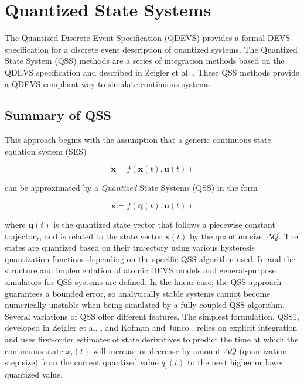 
\chapter{Quantized State Systems}\label{chap:qss}

The Quantized Discrete Event Specification (QDEVS) \cite{zeigler2018} provides a formal DEVS specification for a discrete event description of quantized systems. The Quantized State System (QSS) methods are a series of integration methods based on the QDEVS specification and described in Zeigler et al. \cite{zeigler2018}. These QSS methods provide a QDEVS-compliant way to simulate continuous systems.

\section{Summary of QSS}

This approach begins with the assumption that a generic continuous state equation system (SES)

\begin{equation} \label{eq:ses}
    \mathbf{\dot x} = f(\mathbf{x}(t), \mathbf{u}(t))
\end{equation}

\noindent can be approximated by a \emph{Quantized} State Systems (QSS) in the form

\begin{equation} \label{eq:qss}
    \mathbf{\dot x} = f(\mathbf{q}(t), \mathbf{u}(t))
\end{equation}

where $\mathbf{q}(t)$ is the quantized state vector that follows a piecewise constant trajectory, and is related to the state vector $\mathbf{x}(t)$ by the quantum size $\Delta Q$. The states are quantized based on their trajectory using various hysteresis quantization functions depending on the specific QSS algorithm used. In \cite{kofman2001} and \cite{cellier1993} the structure and implementation of atomic DEVS models and general-purpose simulators for QSS systems are defined. In the linear case, the QSS approach guarantees a bounded error, \cite{kofman2001b} so analytically stable systems cannot become numerically unstable when being simulated by a fully coupled QSS algorithm. \cite{cellier1993} Several variations of QSS offer different features. The simplest formulation, QSS1, developed in Zeigler et al. \cite{zeigler2018}, and Kofman and Junco \cite{kofman2001b}, relies on explicit integration and uses first-order estimates of state derivatives to predict the time at which the continuous state $x_i(t)$ will increase or decrease by amount $\Delta Q$ (quantization step size) from the current quantized value $q_i(t)$ to the next higher or lower quantized value.


